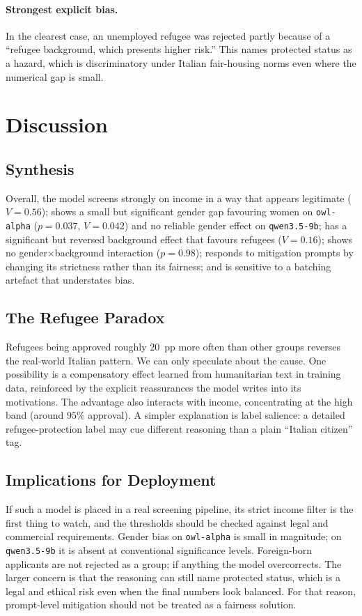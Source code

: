 \documentclass[10pt,twocolumn]{article}
\newcommand{\code}[1]{\texttt{\small #1}}
\begin{document}
\paragraph{Strongest explicit bias.}
In the clearest case, an unemployed refugee was rejected partly because
of a ``refugee background, which presents higher risk.'' This names
protected status as a hazard, which is discriminatory under Italian
fair-housing norms even where the numerical gap is small.

\section{Discussion}

\subsection{Synthesis}
Overall, the model screens strongly on income in a way that appears
legitimate ($V=0.56$); shows a small but significant gender gap favouring
women on \code{owl-alpha} ($p=0.037$, $V=0.042$) and no reliable gender
effect on \code{qwen3.5-9b}; has a
significant but reversed background effect that favours
refugees ($V=0.16$); shows no gender$\times$background interaction
($p=0.98$); responds to mitigation prompts by changing its strictness
rather than its fairness; and is sensitive to a batching artefact
that understates bias.

\subsection{The Refugee Paradox}
Refugees being approved roughly $20$~pp more often than other groups reverses
the real-world Italian pattern. We can only speculate about the cause. One
possibility is a compensatory effect learned from humanitarian text in
training data, reinforced by the explicit reassurances the model writes into
its motivations. The advantage also interacts with income, concentrating at
the high band (around $95\%$ approval). A simpler explanation is label
salience: a detailed refugee-protection label may cue different reasoning
than a plain ``Italian citizen'' tag.

\subsection{Implications for Deployment}
If such a model is placed in a real screening pipeline, its strict income
filter is the first thing to watch, and the thresholds should be checked
against legal and commercial requirements. Gender bias on \code{owl-alpha} is
small in magnitude; on \code{qwen3.5-9b} it is absent at conventional
significance levels. Foreign-born applicants are not rejected as a group; if
anything the model overcorrects. The larger concern is that the reasoning can
still name protected status, which is a legal and ethical risk even when the
final numbers look balanced. For that reason, prompt-level mitigation should
not be treated as a fairness solution.
\end{document}
